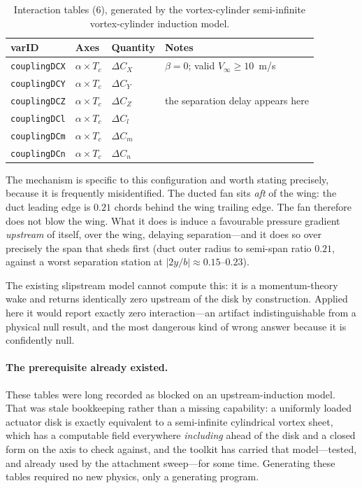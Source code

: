 \documentclass[11pt,a4paper]{article}
\newcommand{\varid}[1]{\texttt{\small #1}}
\begin{document}
\begin{longtable}{@{}lllp{46mm}@{}}
\caption{Interaction tables (6), generated by the vortex-cylinder
semi-infinite vortex-cylinder induction model.}
\label{tab:cpltables} \\
\toprule
\textbf{varID} & \textbf{Axes} & \textbf{Quantity} & \textbf{Notes} \\
\midrule
\endhead
\bottomrule
\endfoot
\varid{couplingDCX} & $\alpha\times T_c$ & $\Delta C_X$ & $\beta = 0$;
valid $V_\infty \geq 10$~m/s \\
\varid{couplingDCY} & $\alpha\times T_c$ & $\Delta C_Y$ & \\
\varid{couplingDCZ} & $\alpha\times T_c$ & $\Delta C_Z$ & the separation
delay appears here \\
\varid{couplingDCl} & $\alpha\times T_c$ & $\Delta C_l$ & \\
\varid{couplingDCm} & $\alpha\times T_c$ & $\Delta C_m$ & \\
\varid{couplingDCn} & $\alpha\times T_c$ & $\Delta C_n$ & \\
\end{longtable}

The mechanism is specific to this configuration and worth stating
precisely, because it is frequently misidentified. The ducted fan sits
\emph{aft} of the wing: the duct leading edge is $0.21$ chords behind the
wing trailing edge. The fan therefore does not blow the wing. What it
does is induce a favourable pressure gradient \emph{upstream} of itself,
over the wing, delaying separation---and it does so over precisely the
span that sheds first (duct outer radius to semi-span ratio $0.21$,
against a worst separation station at $|2y/b| \approx 0.15$--$0.23$).

The existing slipstream model cannot compute this: it is a
momentum-theory wake and returns identically zero upstream of the disk by
construction. Applied here it would report exactly zero interaction---an
artifact indistinguishable from a physical null result, and the most
dangerous kind of wrong answer because it is confidently null.

\paragraph{The prerequisite already existed.} These tables were long
recorded as blocked on an upstream-induction model. That was stale
bookkeeping rather than a missing capability: a uniformly loaded actuator
disk is exactly equivalent to a semi-infinite cylindrical vortex sheet,
which has a computable field everywhere \emph{including} ahead of the
disk and a closed form on the axis to check against, and the toolkit has
carried that model---tested, and already used by the attachment
sweep---for some time. Generating these tables required no new physics,
only a generating program.
\end{document}
